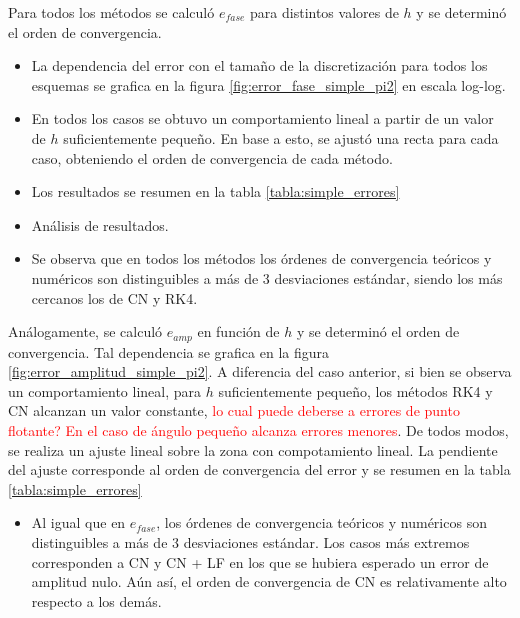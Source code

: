 \documentclass[aps,prb,twocolumn,superscriptaddress,floatfix,longbibliography]{revtex4-2}
\newcounter{para}
\begin{document}
Para todos los métodos se calculó $e_{fase}$ para distintos valores de $h$ y se determinó el orden de convergencia. 
\begin{itemize}
  \item La dependencia del error con el tamaño de la discretización para todos los esquemas se grafica en la figura \ref{fig:error_fase_simple_pi2} en escala log-log. \item En todos los casos se obtuvo un comportamiento lineal a partir de un valor de $h$ suficientemente pequeño. En base a esto, se ajustó una recta para cada caso, obteniendo el orden de convergencia de cada método.
  \item Los resultados se resumen en la tabla \ref{tabla:simple_errores}
  \item Análisis de resultados.
  \item Se observa que en todos los métodos los órdenes de convergencia teóricos y numéricos son distinguibles a más de 3 desviaciones estándar, siendo los más cercanos los de CN y RK4.
\end{itemize}



Análogamente, se calculó $e_{amp}$ en función de $h$ y se determinó el orden de convergencia. Tal dependencia se grafica en la figura \ref{fig:error_amplitud_simple_pi2}. A diferencia del caso anterior, si bien se observa un comportamiento lineal, para $h$ suficientemente pequeño, los métodos RK4 y CN alcanzan un valor constante, \textcolor{red}{lo cual puede deberse a errores de punto flotante? En el caso de ángulo pequeño alcanza errores menores}. De todos modos, se realiza un ajuste lineal sobre la zona con compotamiento lineal. La pendiente del ajuste corresponde al orden de convergencia del error y se resumen en la tabla \ref{tabla:simple_errores}
\begin{itemize}
  \item Al igual que en $e_{fase}$, los órdenes de convergencia teóricos y numéricos son distinguibles a más de 3 desviaciones estándar. Los casos más extremos corresponden a CN y CN + LF en los que se hubiera esperado un error de amplitud nulo. Aún así, el orden de convergencia de CN es relativamente alto respecto a los demás.
\end{itemize}
\end{document}
